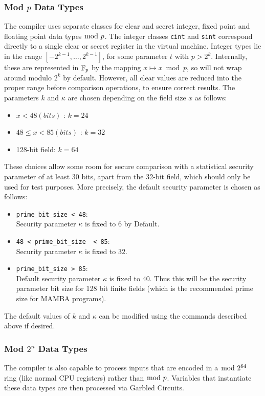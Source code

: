 \subsubsection{Mod $p$ Data Types}
The compiler uses separate classes for clear and secret integer, fixed point
and floating point data types $\bmod \; p$. The integer classes \verb|cint| and \verb|sint|
correspond directly to a single clear or secret register in the virtual machine.
Integer types lie in the range $[-2^{k-1}, \dots, 2^{k-1}]$, for some
parameter $t$ with $p > 2^k$. Internally, these are represented in ${\mathbb{F}}_p$ by the
mapping $x \mapsto x \bmod{p}$, so will not wrap around modulo $2^k$ by default.
However, all clear values are reduced into the proper
range before comparison operations, to ensure correct results.
The parameters $k$ and $\kappa$ are chosen depending on the field size $x$ as follows:
\begin{itemize}
  \item $x < 48 (bits)$ : $k = 24$
  \item $48 \le x < 85 (bits)$ : $k = 32$
  \item 128-bit field: $k = 64$
\end{itemize}
These choices allow some room for secure comparison with a statistical
security parameter of at least 30 bits, apart from the 32-bit field, which
should only be used for test purposes. More precisely, the default security parameter is chosen as follows:
\begin{itemize}
  \item \verb|prime_bit_size < 48|:\\
        Security parameter $\kappa$ is fixed to $6$ by Default.
  \item \verb|48 < prime_bit_size  < 85|: \\
        Security parameter $\kappa$ is fixed to $32$.
  \item \verb|prime_bit_size > 85|:\\
        Default security parameter $\kappa$ is fixed to 40. Thus this will be the security parameter bit size for 128 bit finite
        fields (which is the recommended prime size for MAMBA programs).
\end{itemize}
The default values of $k$ and $\kappa$ can be modified using the commands described above if desired.

\subsubsection{Mod $2^n$ Data Types}
\label{sec:mod2n}
The compiler is also capable to process inputs that are encoded in a $\bmod \; 2^{64}$  ring (like normal CPU registers)
rather than $\bmod \; p$.
Variables that instantiate these data types are then processed via Garbled Circuits.

